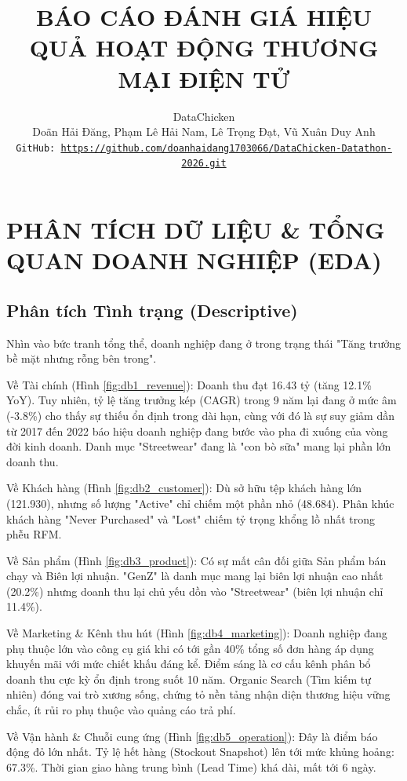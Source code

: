 \documentclass{article}
\title{BÁO CÁO ĐÁNH GIÁ HIỆU QUẢ HOẠT ĐỘNG THƯƠNG MẠI ĐIỆN TỬ}
\author{%
  DataChicken \\
  Doãn Hải Đăng, Phạm Lê Hải Nam, Lê Trọng Đạt, Vũ Xuân Duy Anh\\
  \texttt{GitHub: \url{https://github.com/doanhaidang1703066/DataChicken-Datathon-2026.git}}
}
\begin{document}
\maketitle

\section{PHÂN TÍCH DỮ LIỆU \& TỔNG QUAN DOANH NGHIỆP (EDA)}

\subsection{Phân tích Tình trạng (Descriptive)}

Nhìn vào bức tranh tổng thể, doanh nghiệp đang ở trong trạng thái "Tăng trưởng bề mặt nhưng rỗng bên trong".

Về Tài chính (Hình \ref{fig:db1_revenue}): Doanh thu đạt 16.43 tỷ (tăng 12.1\% YoY). Tuy nhiên, tỷ lệ tăng trưởng kép (CAGR) trong 9 năm lại đang ở mức âm (-3.8\%) cho thấy sự thiếu ổn định trong dài hạn, cùng với đó là sự suy giảm dần từ 2017 đến 2022 báo hiệu doanh nghiệp đang bước vào pha đi xuống của vòng đời kinh doanh. Danh mục "Streetwear" đang là "con bò sữa" mang lại phần lớn doanh thu.

Về Khách hàng (Hình \ref{fig:db2_customer}): Dù sở hữu tệp khách hàng lớn (121.930), nhưng số lượng "Active" chỉ chiếm một phần nhỏ (48.684). Phân khúc khách hàng "Never Purchased" và "Lost" chiếm tỷ trọng khổng lồ nhất trong phễu RFM.

Về Sản phẩm (Hình \ref{fig:db3_product}): Có sự mất cân đối giữa Sản phẩm bán chạy và Biên lợi nhuận. "GenZ" là danh mục mang lại biên lợi nhuận cao nhất (20.2\%) nhưng doanh thu lại chủ yếu dồn vào "Streetwear" (biên lợi nhuận chỉ 11.4\%).

Về Marketing \& Kênh thu hút (Hình \ref{fig:db4_marketing}): Doanh nghiệp đang phụ thuộc lớn vào công cụ giá khi có tới gần 40\% tổng số đơn hàng áp dụng khuyến mãi với mức chiết khấu đáng kể. Điểm sáng là cơ cấu kênh phân bổ doanh thu cực kỳ ổn định trong suốt 10 năm. Organic Search (Tìm kiếm tự nhiên) đóng vai trò xương sống, chứng tỏ nền tảng nhận diện thương hiệu vững chắc, ít rủi ro phụ thuộc vào quảng cáo trả phí.

Về Vận hành \& Chuỗi cung ứng (Hình \ref{fig:db5_operation}): Đây là điểm báo động đỏ lớn nhất. Tỷ lệ hết hàng (Stockout Snapshot) lên tới mức khủng hoảng: 67.3\%. Thời gian giao hàng trung bình (Lead Time) khá dài, mất tới 6 ngày.
\end{document}
